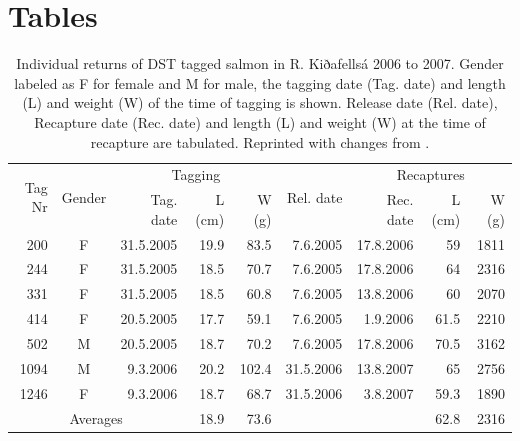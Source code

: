 
\clearpage
\section*{Tables}

\begin{table}[ht]
  \centering
  \caption{Individual returns of DST tagged salmon in R. Kiðafellsá 2006 to 2007. 
    Gender labeled as F for female and M for male, 
    the tagging date (Tag. date) and length (L) and weight (W) of the time of tagging is shown.
    Release date (Rel. date), Recapture date (Rec. date) and length (L) and weight (W) at the time of recapture are tabulated. Reprinted with changes from \citet{Gudjonsson2015}.}
  \begin{tabular}{rcrrrrrrr}
    \hline
     \multirow{2}{*}{Tag Nr} & \multirow{2}{*}{Gender} &   \multicolumn{3}{c}{Tagging} & \multirow{2}{*}{Rel. date} &\multicolumn{3}{c}{Recaptures}\\
     \cline{3-5} \cline{7-9}
     && Tag. date & L (cm) & W (g) && Rec. date & L (cm)&W (g)  \\
    \hline
     200 & F & 31.5.2005 & 19.9 & 83.5&  7.6.2005 & 17.8.2006 &59  & 1811 \\
     244 & F & 31.5.2005 & 18.5 & 70.7&  7.6.2005 & 17.8.2006 &64  & 2316 \\
     331 & F & 31.5.2005 & 18.5 & 60.8&  7.6.2005 & 13.8.2006 &60 & 2070 \\
     414 & F & 20.5.2005 & 17.7 & 59.1&  7.6.2005 &  1.9.2006 &61.5& 2210 \\
     502 & M & 20.5.2005 & 18.7 & 70.2&  7.6.2005 & 17.8.2006 &70.5& 3162 \\
    1094 & M &  9.3.2006 & 20.2 &102.4& 31.5.2006 & 13.8.2007 &65  & 2756 \\
    1246 & F &  9.3.2006 & 18.7 & 68.7& 31.5.2006 & 3.8.2007 &59.3& 1890 \\
    \hline
    \multicolumn{3}{c}{Averages}&18.9&73.6&&&62.8&2316\\
    \hline
  \end{tabular}
  \label{tab:WandL}
\end{table}


